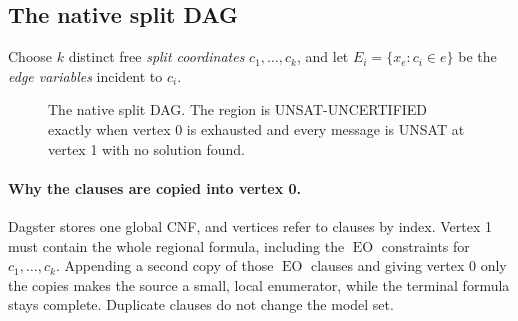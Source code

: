 \documentclass[11pt,a4paper,oneside]{report}
\theoremstyle{definition}
\newcommand{\EO}{\operatorname{EO}}
\begin{document}
\subsection{The native split DAG}

Choose $k$ distinct free \emph{split coordinates} $c_1,\dots,c_k$, and let
$E_i=\{x_e: c_i\in e\}$ be the \emph{edge variables} incident to $c_i$.

\begin{figure}[H]
\centering
{}
\caption{The native split DAG. The region is UNSAT-UNCERTIFIED exactly when vertex 0 is
exhausted and every message is UNSAT at vertex 1 with no solution found.}
\label{p8-fig:dag}
\end{figure}

\paragraph{Why the clauses are copied into vertex 0.} Dagster stores one global CNF, and
vertices refer to clauses by index. Vertex 1 must contain the whole regional formula,
including the $\EO$ constraints for $c_1,\dots,c_k$. Appending a second copy of those $\EO$
clauses and giving vertex 0 only the copies makes the source a small, local enumerator,
while the terminal formula stays complete. Duplicate clauses do not change the model set.
\end{document}
